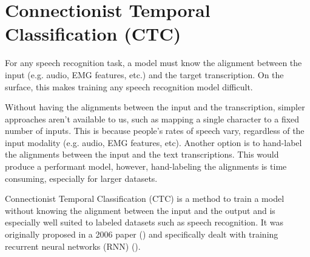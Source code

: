 \section{Connectionist Temporal Classification (CTC)}

For any speech recognition task, a model must know the alignment
between the input (e.g. audio, EMG features, etc.) and the target
transcription. On the surface, this makes training any speech
recognition model difficult.

Without having the alignments between the input and the transcription,
simpler approaches aren't available to us, such as mapping a single
character to a fixed number of inputs. This is because people's rates
of speech vary, regardless of the input modality (e.g. audio, EMG features,
etc). Another option is to hand-label the alignments between the input
and the text transcriptions. This would produce a performant model, however,
hand-labeling the alignments is time consuming, especially for larger datasets.

Connectionist Temporal Classification (CTC) is a method to train a model
without knowing the alignment between the input and the output and is especially
well suited to labeled datasets such as speech recognition.
It was originally proposed in a 2006 paper (\cite{ctc_original}) and specifically
dealt with training recurrent neural networks (RNN) (\cite{rnn_fundamentals}).